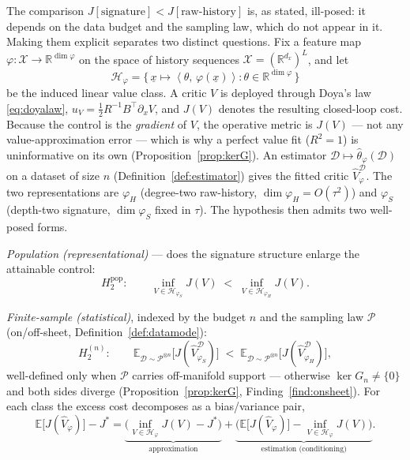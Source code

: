 \documentclass[11pt]{article}
\renewcommand{\_}{\discretionary{\textunderscore}{}{\textunderscore}}
\theoremstyle{plain}
\theoremstyle{definition}
\newcommand{\R}{\mathbb{R}}
\newcommand{\E}{\mathbb{E}}
\newcommand{\inner}[2]{\left\langle #1,\, #2 \right\rangle}
\newcommand{\half}{\tfrac12}
\begin{document}
The comparison $J[\text{signature}]<J[\text{raw-history}]$ is, as stated, ill-posed: it depends on
the data budget and the sampling law, which do not appear in it. Making them explicit separates two
distinct questions. Fix a feature map $\varphi:\mathcal X\to\R^{\dim\varphi}$ on the space of history
sequences $\mathcal X=(\R^{d_x})^{L}$, and let
\[
\mathcal H_\varphi=\big\{\,\underline x\mapsto\inner{\theta}{\varphi(\underline x)}:\theta\in\R^{\dim\varphi}\,\big\}
\]
be the induced linear value class. A critic $V$ is deployed through Doya's law \eqref{eq:doyalaw},
$u_{V}=\half R^{-1}B^{\top}\partial_{x}V$, and $J(V)$ denotes the resulting closed-loop cost. Because
the control is the \emph{gradient} of $V$, the operative metric is $J(V)$ --- not any
value-approximation error --- which is why a perfect value fit ($R^{2}=1$) is uninformative on its
own (Proposition~\ref{prop:kerG}). An estimator $\mathcal D\mapsto\hat\theta_\varphi(\mathcal D)$ on a
dataset of size $n$ (Definition~\ref{def:estimator}) gives the fitted critic $\hat V_\varphi^{\mathcal D}$.
The two representations are $\varphi_H$ (degree-two raw-history, $\dim\varphi_H=O(\tau^{2})$) and $\varphi_S$
(depth-two signature, $\dim\varphi_S$ fixed in $\tau$). The hypothesis then admits two well-posed forms.

\emph{Population (representational)} --- does the signature structure enlarge the attainable control:
\begin{equation}\label{eq:h2pop}
H_2^{\mathrm{pop}}:\qquad \inf_{V\in\mathcal H_{\varphi_S}}J(V)\;<\;\inf_{V\in\mathcal H_{\varphi_H}}J(V).
\end{equation}

\emph{Finite-sample (statistical)}, indexed by the budget $n$ and the sampling law $\mathcal P$
(on/off-sheet, Definition~\ref{def:datamode}):
\begin{equation}\label{eq:h2n}
H_2^{(n)}:\qquad
\E_{\mathcal D\sim\mathcal P^{\otimes n}}\!\big[J(\hat V_{\varphi_S}^{\mathcal D})\big]\;<\;
\E_{\mathcal D\sim\mathcal P^{\otimes n}}\!\big[J(\hat V_{\varphi_H}^{\mathcal D})\big],
\end{equation}
well-defined only when $\mathcal P$ carries off-manifold support --- otherwise $\ker G_n\ne\{0\}$
and both sides diverge (Proposition~\ref{prop:kerG}, Finding~\ref{find:onsheet}). For each class the
excess cost decomposes as a bias/variance pair,
\begin{equation}\label{eq:h2decomp}
\E\big[J(\hat V_\varphi)\big]-J^{\ast}=
\underbrace{\Big(\inf_{V\in\mathcal H_\varphi}J(V)-J^{\ast}\Big)}_{\text{approximation}}
+\underbrace{\Big(\E\big[J(\hat V_\varphi)\big]-\inf_{V\in\mathcal H_\varphi}J(V)\Big)}_{\text{estimation (conditioning)}}.
\end{equation}
\end{document}
